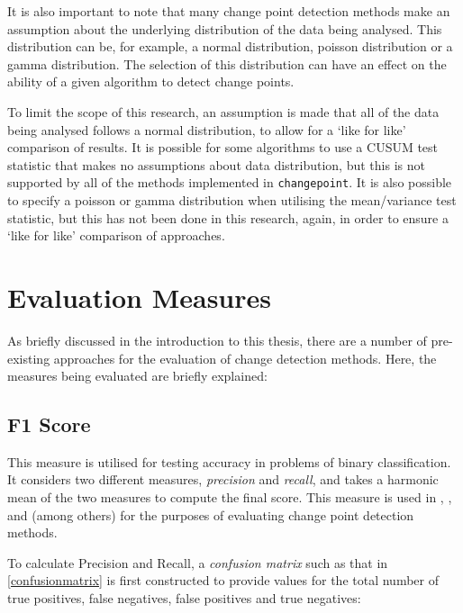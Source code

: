 \documentclass[../main.tex]{subfiles}
\begin{document}
It is also important to note that many change point detection methods make an assumption about the underlying distribution of the data being analysed. This distribution can be, for example, a normal distribution, poisson distribution or a gamma distribution. The selection of this distribution can have an effect on the ability of a given algorithm to detect change points.

To limit the scope of this research, an assumption is made that all of the data being analysed follows a normal distribution, to allow for a `like for like' comparison of results. It is possible for some algorithms to use a CUSUM test statistic that makes no assumptions about data distribution, but this is not supported by all of the methods implemented in \texttt{changepoint}. It is also possible to specify a poisson or gamma distribution when utilising the mean/variance test statistic, but this has not been done in this research, again, in order to ensure a `like for like' comparison of approaches.

\section{Evaluation Measures}

As briefly discussed in the introduction to this thesis, there are a number of pre-existing approaches for the evaluation of change detection methods. Here, the measures being evaluated are briefly explained:

\subsection{F1 Score}

This measure is utilised for testing accuracy in problems of binary classification. It considers two different measures, \emph{precision} and \emph{recall}, and takes a harmonic mean of the two measures to compute the final score. This measure is used in \cite{Qahtan2015}, \cite{Buntain2014}, and \cite{Pelecanos2010} (among others) for the purposes of evaluating change point detection methods.
	
	To calculate Precision and Recall, a \emph{confusion matrix} such as that in \autoref{confusionmatrix} is first constructed to provide values for the total number of true positives, false negatives, false positives and true negatives:
	
\end{document}
